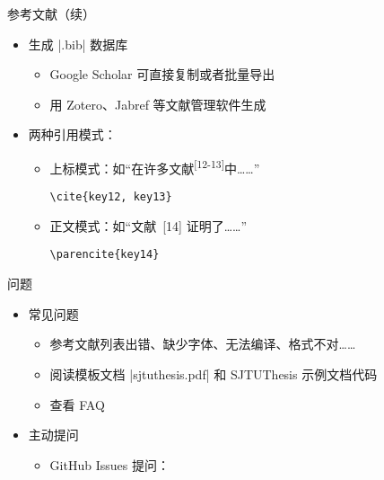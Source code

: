 \begin{frame}[fragile]{参考文献（续）}
  \begin{itemize}
    \item 生成 |.bib| 数据库
      \begin{itemize}
        \item Google Scholar 可直接复制或者批量导出
        \item 用 Zotero、Jabref 等文献管理软件生成
      \end{itemize}
    \item 两种引用模式：
      \begin{itemize}
        \item 上标模式：如“在许多文献\textsuperscript{[12-13]}中……”
          \begin{lstlisting}[basicstyle=\ttfamily]
    \cite{key12, key13}
          \end{lstlisting}
        \item 正文模式：如“文献~[14] 证明了……”
          \begin{lstlisting}[basicstyle=\ttfamily]
    \parencite{key14}
          \end{lstlisting}
        \end{itemize}
      \end{itemize}
\end{frame}

\begin{frame}[fragile]{\SJTUThesis 问题}
    \begin{itemize}
      \item 常见问题
        \begin{itemize}
          \item 参考文献列表出错、缺少字体、无法编译、格式不对……
          \item 阅读模板文档 |sjtuthesis.pdf| 和 SJTUThesis 示例文档代码
          \item 查看 FAQ 
        \end{itemize}
      \item 主动提问
        \begin{itemize}
          \item GitHub Issues 提问：
        \end{itemize}
    \end{itemize}
\end{frame}
